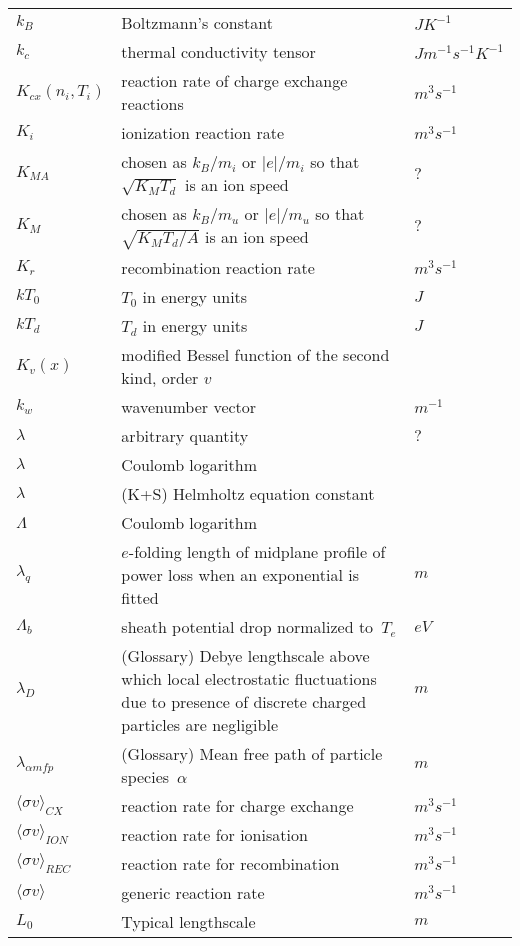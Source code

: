 \begin{longtable}{|p{3.0cm}|p{10.0cm}|p{3.0cm}|}
$k_B$ & Boltzmann's constant  & $J K^{-1}$ \\
$k_c$ & thermal conductivity tensor  & $J m^{-1} s^{-1} K^{-1}$ \\
$K_{cx}\left( n_i, T_i \right)$ & reaction rate of charge exchange reactions  & $m^3 s^{-1}$ \\
$K_i$ & ionization reaction rate  & $m^3 s^{-1}$ \\
$K_{MA}$ & chosen as $k_B/m_i$ or $|e|/m_i$ so that $\sqrt{K_MT_d}$ is an ion speed & $?$ \\
$K_M$ & chosen as $k_B/m_u$ or $|e|/m_u$ so that $\sqrt{K_MT_d/A}$ is an ion speed & $?$ \\
$K_r$ & recombination reaction rate  & $m^3 s^{-1}$ \\
$kT_0$ & $T_0$ in energy units  & $J$ \\
$kT_d$ & $T_d$ in energy units  & $J$ \\
$K_v(x)$ & modified Bessel function of the second kind, order $v$  & \\
$k_w$ & wavenumber vector & $m^{-1}$ \\
$\lambda$ & arbitrary quantity  & $?$ \\
$\lambda$ & Coulomb logarithm & \\
$\lambda$ &  (K+S) Helmholtz equation constant & \\
$\Lambda$ & Coulomb logarithm & \\
$\lambda_q$ & $e$-folding length of midplane profile of power loss when an exponential is fitted & $m$ \\
$\Lambda_b$ & sheath potential drop normalized to~$T_e$  & $eV$ \\
$\lambda_D$ & (Glossary) Debye lengthscale above which local electrostatic fluctuations due to presence of discrete charged particles are negligible  & $m$ \\
$\lambda_{\alpha mfp}$ & (Glossary) Mean free path of particle species~$\alpha$ & $m$  \\
$\langle \sigma v \rangle_{CX}$ & reaction rate for charge exchange  & $m^3 s^{-1}$ \\
$\langle \sigma v \rangle_{ION}$ & reaction rate for ionisation  & $m^3 s^{-1}$ \\
$\langle \sigma v \rangle_{REC}$ & reaction rate for recombination  & $m^3 s^{-1}$ \\
$\langle\sigma v\rangle$ & generic reaction rate  & $m^3 s^{-1}$ \\
$L_0$ & Typical lengthscale  & $m$ \\

\end{longtable}
